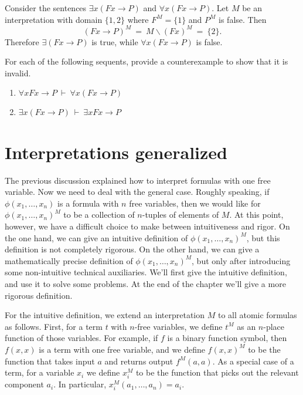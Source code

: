 \begin{example} Consider the sentences $\exists x(Fx\to P)$ and
  $\forall x(Fx\to P)$.  Let $M$
  be an interpretation with domain $\{ 1,2\}$ where $F^M=\{ 1\}$ and
  $P^M$ is false.  Then
  \[ (Fx\to P)^M \: = \: M\backslash (Fx)^M \: = \: \{ 2 \} .\]
  Therefore $\exists (Fx\to P)$ is true, while $\forall x(Fx\to P)$ is
  false. \end{example}

\begin{exercise}  For each of the following sequents, provide a counterexample to show
  that it is invalid.
  \begin{enumerate}
  \item $\forall xFx\to P\: \vdash \: \forall x(Fx\to P)$
  \item $\exists x(Fx\to P)\: \vdash \: \exists xFx\to P$
  \end{enumerate}
\end{exercise}



\section{Interpretations generalized}

The previous discussion explained how to interpret formulas with one
free variable.  Now we need to deal with the general case.  Roughly
speaking, if $\phi (x_1,\dots ,x_n)$ is a formula with $n$ free
variables, then we would like for $\phi (x_1,\dots ,x_n)^M$ to be a
collection of $n$-tuples of elements of $M$.  At this point, however,
we have a difficult choice to make between intuitiveness and rigor.
On the one hand, we can give an intuitive definition of
$\phi (x_1,\dots ,x_n)^M$, but this definition is not completely
rigorous.  On the other hand, we can give a mathematically precise
definition of $\phi (x_1,\dots ,x_n)^M$, but only after introducing
some non-intuitive technical auxiliaries.  We'll first give the
intuitive definition, and use it to solve some problems.  At the end
of the chapter we'll give a more rigorous definition.

For the intuitive definition, we extend an interpretation $M$ to all
atomic formulas as follows.  First, for a term $t$ with $n$-free
variables, we define $t^M$ as an $n$-place function of those
variables.  For example, if $f$ is a binary function symbol, then
$f(x,x)$ is a term with one free variable, and we define $f(x,x)^M$ to
be the function that takes input $a$ and returns output $f^M(a,a)$.
As a special case of a term, for a variable $x_i$ we define $x_i^M$ to
be the function that picks out the relevant component $a_i$.  In
particular, $x_i^M(a_1,\dots ,a_n)=a_i$.


